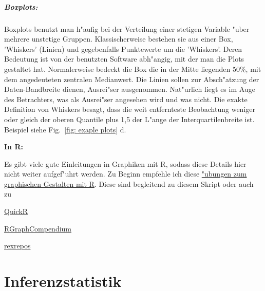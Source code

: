 \documentclass[a4paper,twoside]{tufte-book}\usepackage[]{graphicx}\usepackage[]{color}
\begin{document}
\paragraph{Boxplots:} Boxplots benutzt man h"aufig bei der Verteilung einer stetigen Variable "uber mehrere unstetige Gruppen. Klassischerweise bestehen sie aus einer Box, 'Whiskers' (Linien) und gegebenfalls Punktewerte um die 'Whiskers'. Deren Bedeutung ist von der benutzten Software abh"angig, mit der man die Plots gestaltet hat. Normalerweise bedeckt die Box die in der Mitte liegenden 50\%, mit dem angedeuteten zentralen Medianwert. Die Linien sollen zur Absch"atzung der Daten-Bandbreite dienen, Ausrei"ser ausgenommen. Nat"urlich liegt es im Auge des Betrachters, was als Ausrei"ser angesehen wird und was nicht. Die exakte Definition von Whiskers besagt, dass die weit entfernteste Beobachtung weniger oder gleich der oberen Quantile plus 1,5 der L"ange der Interquartilenbreite ist. Beispiel siehe Fig.~\ref{fig: exaple plots} d.

\vspace{1cm}
\begin{fullwidth}
\begin{mdframed}
    
\textbf{In R:} 

Es gibt viele gute Einleitungen in Graphiken mit R, sodass diese Details hier nicht weiter aufgef"uhrt werden. Zu Beginn empfehle ich diese  \href{https://github.com/florianhartig/ResearchSkills/tree/master/Labs/Statistics/Practicals/GraphicsInR}{"ubungen zum graphischen Gestalten mit R}. Diese sind begleitend zu diesem Skript oder auch zu

\begin{itemize*}
  \item \href{http://www.statmethods.net/graphs/index.html}{QuickR}
  \item \href{http://shinyapps.org/apps/RGraphCompendium/index.php}{RGraphCompendium}
  \item \href{http://www.uni-kiel.de/psychologie/rexrepos/rerDiagrams.html}{rexrepos}
\end{itemize*}

\end{mdframed}
\end{fullwidth} 


\chapter{Inferenzstatistik}

\end{document}
